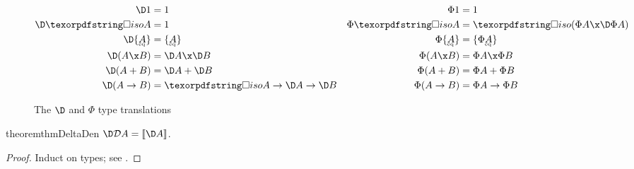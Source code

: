 \documentclass{rntz}\usepackage{fantasy}%
\begin{document}
\begin{figure*}
  \begin{align*}
    \D\tunit &= \tunit & \Phi\tunit &= \tunit
    \\
    \D \isof A &= \tunit & \Phi \isof A &= \isof{(\Phi A \x \DP A)}
    \\
    \D\tseteq A &= \tseteq A &
    \Phi\tseteq A &= \tset{\Phi{\eqt A}}\\
    \D(A \x B) &= \D A \x \D B & \Phi(A \x B) &= \Phi A \x \Phi B\\
    \D(A + B) &= \D A + \D B & \Phi(A + B) &= \Phi A + \Phi B\\
    \D(A \to B) &= \isof A \to \D A \to \D B &
    \Phi(A \to B) &= \Phi A \to \Phi B
  \end{align*}


  \caption{The $\D$ and $\Phi$ type translations}
  \label{fig:PhiDelta}
\end{figure*}

\begin{restatable}{theorem}{thmDeltaDen}
  \label{thm:delta-den}
  \(\D\incdens A = \den{\D A}\).
\end{restatable}
\begin{proof}
  Induct on types; see .
\end{proof}


\end{document}

